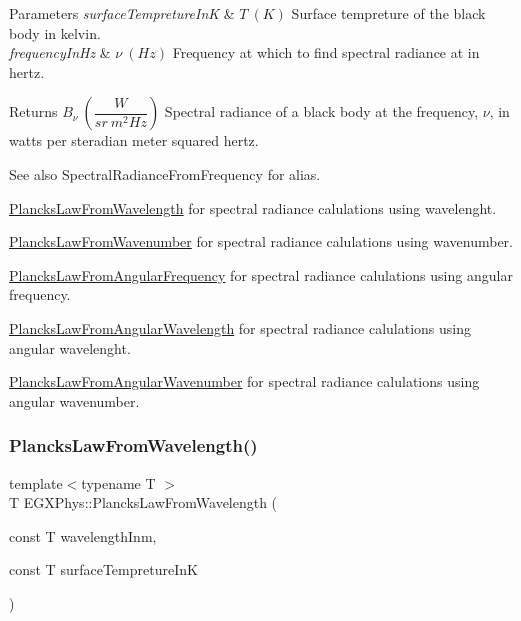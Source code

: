 \begin{DoxyParams}{Parameters}
{\em surface\+Tempreture\+InK} & $T\ (K)$ Surface tempreture of the black body in kelvin. \\
\hline
{\em frequency\+In\+Hz} & $\nu\ (Hz)$ Frequency at which to find spectral radiance at in hertz. \\
\hline
\end{DoxyParams}
\begin{DoxyReturn}{Returns}
$B_{\nu}\ ( \dfrac{W}{sr\ m^2 Hz})$ Spectral radiance of a black body at the frequency, $\nu$, in watts per steradian meter squared hertz. 
\end{DoxyReturn}
\begin{DoxySeeAlso}{See also}
Spectral\+Radiance\+From\+Frequency for alias. 

\mbox{\hyperlink{group___e_g_x_phys-_electrodynamics-_black_body-_plancks_law_ga54639bc031ded51ef78aa82b0457a4dd}{Plancks\+Law\+From\+Wavelength}} for spectral radiance calulations using wavelenght. 

\mbox{\hyperlink{group___e_g_x_phys-_electrodynamics-_black_body-_plancks_law_ga6648ae2a0fbff6735c1e1a04c7cac746}{Plancks\+Law\+From\+Wavenumber}} for spectral radiance calulations using wavenumber. 

\mbox{\hyperlink{group___e_g_x_phys-_electrodynamics-_black_body-_plancks_law_gaac540560c71e30c02b91d22e417b5863}{Plancks\+Law\+From\+Angular\+Frequency}} for spectral radiance calulations using angular frequency. 

\mbox{\hyperlink{group___e_g_x_phys-_electrodynamics-_black_body-_plancks_law_ga7322124727f968d28807e918c5eeb23f}{Plancks\+Law\+From\+Angular\+Wavelength}} for spectral radiance calulations using angular wavelenght. 

\mbox{\hyperlink{group___e_g_x_phys-_electrodynamics-_black_body-_plancks_law_gaa3d3e0fdb77d25bdd40523f9975de902}{Plancks\+Law\+From\+Angular\+Wavenumber}} for spectral radiance calulations using angular wavenumber. 
\end{DoxySeeAlso}
\mbox{\label{group___e_g_x_phys-_electrodynamics-_black_body-_plancks_law_ga54639bc031ded51ef78aa82b0457a4dd}} 
\subsubsection{\texorpdfstring{Plancks\+Law\+From\+Wavelength()}{PlancksLawFromWavelength()}}
{\footnotesize\ttfamily template$<$typename T $>$ \\
T E\+G\+X\+Phys\+::\+Plancks\+Law\+From\+Wavelength (\begin{DoxyParamCaption}\item[{const T}]{wavelength\+Inm,  }\item[{const T}]{surface\+Tempreture\+InK }\end{DoxyParamCaption})}



